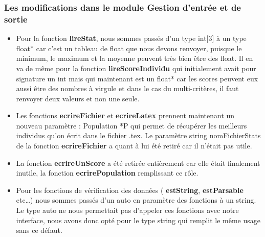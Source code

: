 \documentclass[a4paper,11pt]{article}
\begin{document}
   			\subsubsection{Les modifications dans le module Gestion d’entrée et de sortie}
   				\begin{itemize}
   					\item Pour la fonction  \textbf{lireStat}, nous sommes passés d’un type int[3] à un type float* car c’est un tableau de float que nous devons renvoyer, puisque le minimum, le maximum et la moyenne peuvent très bien être des float.
   					Il en va de même pour la fonction  \textbf{lireScoreIndividu} qui initialement avait pour signature un int mais qui maintenant est un float* car les scores peuvent eux aussi être des nombres à virgule et dans le cas du multi-critères, il faut renvoyer deux valeurs et non une seule.

   					\item Les fonctions  \textbf{ecrireFichier} et  \textbf{ecrireLatex} prennent maintenant un nouveau paramètre : Population *P qui permet de récupérer les meilleurs individus qu’on écrit dans le fichier .tex. Le paramètre string nomFichierStats de la fonction  \textbf{ecrireFichier} a quant à lui été retiré car il n'était pas utile.
   					\item La fonction  \textbf{ecrireUnScore} a été retirée entièrement car elle était finalement inutile, la fonction  \textbf{ecrirePopulation} remplissant ce rôle.

   					\item Pour les fonctions de vérification des données ( \textbf{estString},  \textbf{estParsable} etc…) nous sommes passés d’un auto en paramètre des fonctions à un string. Le type auto ne nous permettait pas d'appeler ces fonctions avec notre interface, nous avons donc opté pour le type string qui remplit le même usage sans ce défaut.
   				\end{itemize}
\end{document}
